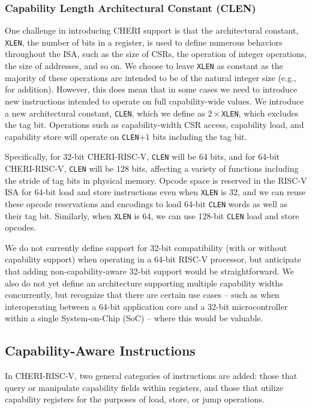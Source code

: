 \subsubsection{Capability Length Architectural Constant (CLEN)}

One challenge in introducing CHERI support is that the architectural constant,
\texttt{XLEN}, the number of bits in a register, is used to define numerous
behaviors throughout the ISA, such as the size of CSRs, the operation of
integer operations, the size of addresses, and so on.
We choose to leave \texttt{XLEN} as constant as the majority of these operations
are intended to be of the natural integer size (e.g., for addition).
However, this does mean that in some cases we need to introduce new
instructions intended to operate on full capability-wide values.
We introduce a new architectural constant, \texttt{CLEN}, which we define as
$2\times$\texttt{XLEN}, which excludes the tag bit.
Operations such as capability-width CSR access, capability load, and capability
store will operate on \texttt{CLEN}$+1$ bits including the tag bit.

Specifically, for 32-bit CHERI-RISC-V, \texttt{CLEN} will be 64 bits, and for
64-bit CHERI-RISC-V, \texttt{CLEN} will be 128 bits, affecting a variety of
functions including the stride of tag bits in physical memory.
Opcode space is reserved in the RISC-V ISA for 64-bit load and store
instructions even when \texttt{XLEN} is 32, and we can reuse these opcode
reservations and encodings to load 64-bit \texttt{CLEN} words as well as
their tag bit.
Similarly, when \texttt{XLEN} is 64, we can use 128-bit \texttt{CLEN} load
and store opcodes.

We do not currently define support for 32-bit compatibility (with or without
capability support) when operating in a 64-bit RISC-V processor, but
anticipate that adding non-capability-aware 32-bit support would be
straightforward.
We also do not yet define an architecture supporting multiple capability
widths concurrently, but recognize that there are certain use cases -- such as
when interoperating between a 64-bit application core and a 32-bit
microcontroller within a single System-on-Chip (SoC) -- where this would be
valuable.

\subsection{Capability-Aware Instructions}

In CHERI-RISC-V, two general categories of instructions are added: those that
query or manipulate capability fields within registers, and those that
utilize capability registers for the purposes of load, store, or jump operations.

